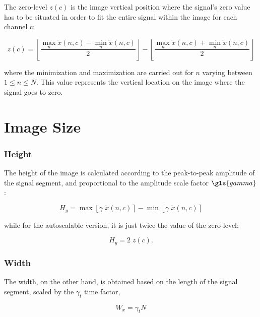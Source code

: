 The zero-level $z(c)$ is the image vertical position where the signal's zero value has to be situated in order to fit the entire signal within the image for each channel c:

\begin{equation}
z(c) = \left \lfloor{ \frac{\max_{n} \tilde{x}(n,c)  - \min_{n} \tilde{x}(n,c) }{2} }\right \rfloor -   \left \lfloor{ \frac{\max_{n} \tilde{x}(n,c)  + \min_{n} \tilde{x}(n,c)}{ 2} }\right \rfloor
\label{eq:zerolevel}
\end{equation}

\noindent where the minimization and maximization are carried out for $n$ varying between ${1 \leq n\leq N}$. This value represents the vertical location on the image where the signal goes to zero.  

\section{Image Size}

\subsubsection{Height}

The height of the image is calculated according to the peak-to-peak amplitude of the signal segment, and proportional to the amplitude scale factor $\gls{gamma}$:

\begin{equation}
H_y = \max \left\lfloor \gamma \; \tilde{x}(n,c) \right\rceil  - \min \left\lfloor \gamma \; \tilde{x}(n,c) \right\rceil 
\label{eq:height}
\end{equation}

\noindent while for the autoscalable version, it is just twice the value of the zero-level:

\begin{equation}
H_y = 2 \; z(c) .
\label{eq:autoscaleheight}
\end{equation}


\subsubsection{Width}

The width, on the other hand, is obtained based on the length of the signal segment, scaled by the $\gamma_t$  time factor,

\begin{equation}
W_x = \gamma_t  N
\label{eq:width}
\end{equation}

